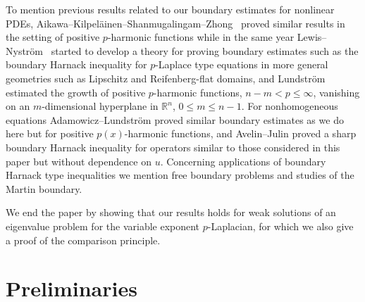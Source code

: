 \documentclass[12pt]{article}
\numberwithin{komcounter}{section}
\begin{document}
To mention previous results related to our boundary estimates for nonlinear PDEs,
Aikawa--Kilpel\"ainen--Shanmugalingam--Zhong~\cite{AKSZ07} proved similar results in the setting of positive $p$-harmonic functions while in the same year Lewis--Nystr\"om~\cite{LN07, LN10, LN12} started to develop a theory for proving boundary estimates such as the boundary Harnack inequality for $p$-Laplace type equations in more general geometries such as Lipschitz and Reifenberg-flat domains, and
Lundstr\"om \cite{N11, N16} estimated the growth of positive $p$-harmonic functions,
$n-m < p \leq \infty$,
vanishing on an $m$-dimensional hyperplane in $\mathbb{R}^n$, $0 \leq m \leq n-1$.
For nonhomogeneous equations Adamowicz--Lundstr\"om \cite{AL16} proved similar boundary estimates as we do here
but for positive $p(x)$-harmonic functions, and
Avelin--Julin \cite{AJ17} proved a sharp boundary Harnack inequality for operators similar to those considered in this paper but without dependence on $u$.
Concerning applications of boundary Harnack type inequalities we mention free boundary problems and
studies of the Martin boundary.


We end the paper by showing that our results holds for weak solutions of an eigenvalue problem for the variable exponent $p$-Laplacian,
for which we also give a proof of the comparison principle.



\setcounter{theorem}{0}
\setcounter{equation}{0}

\section{Preliminaries}
\label{sec:prel}
\end{document}
